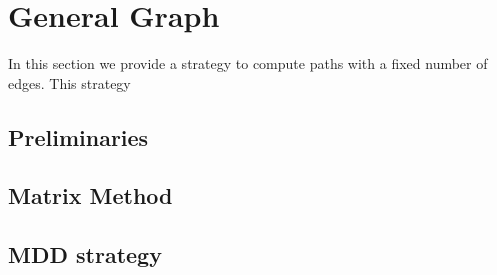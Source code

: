 \section{General Graph}

In this section we provide a strategy to compute paths with a fixed number of edges. This strategy

\subsection{Preliminaries}

\subsection{Matrix Method}

\subsection{MDD strategy}